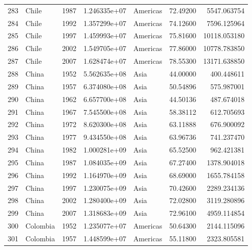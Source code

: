 \documentclass[
  letterpaper,
  DIV=11,
  numbers=noendperiod]{scrreprt}
\begin{document}
\begin{tabular}{llrrlrr}
283  &                     Chile &  1987 &  1.246335e+07 &  Americas &  72.49200 &    5547.063754 \\
284  &                     Chile &  1992 &  1.357299e+07 &  Americas &  74.12600 &    7596.125964 \\
285  &                     Chile &  1997 &  1.459993e+07 &  Americas &  75.81600 &   10118.053180 \\
286  &                     Chile &  2002 &  1.549705e+07 &  Americas &  77.86000 &   10778.783850 \\
287  &                     Chile &  2007 &  1.628474e+07 &  Americas &  78.55300 &   13171.638850 \\
288  &                     China &  1952 &  5.562635e+08 &      Asia &  44.00000 &     400.448611 \\
289  &                     China &  1957 &  6.374080e+08 &      Asia &  50.54896 &     575.987001 \\
290  &                     China &  1962 &  6.657700e+08 &      Asia &  44.50136 &     487.674018 \\
291  &                     China &  1967 &  7.545500e+08 &      Asia &  58.38112 &     612.705693 \\
292  &                     China &  1972 &  8.620300e+08 &      Asia &  63.11888 &     676.900092 \\
293  &                     China &  1977 &  9.434550e+08 &      Asia &  63.96736 &     741.237470 \\
294  &                     China &  1982 &  1.000281e+09 &      Asia &  65.52500 &     962.421381 \\
295  &                     China &  1987 &  1.084035e+09 &      Asia &  67.27400 &    1378.904018 \\
296  &                     China &  1992 &  1.164970e+09 &      Asia &  68.69000 &    1655.784158 \\
297  &                     China &  1997 &  1.230075e+09 &      Asia &  70.42600 &    2289.234136 \\
298  &                     China &  2002 &  1.280400e+09 &      Asia &  72.02800 &    3119.280896 \\
299  &                     China &  2007 &  1.318683e+09 &      Asia &  72.96100 &    4959.114854 \\
300  &                  Colombia &  1952 &  1.235077e+07 &  Americas &  50.64300 &    2144.115096 \\
301  &                  Colombia &  1957 &  1.448599e+07 &  Americas &  55.11800 &    2323.805581 \\

\end{tabular}
\end{document}
